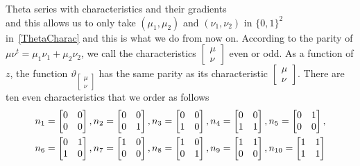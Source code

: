 \documentclass[12pt]{amsart}
\numberwithin{equation}{section}
\numberwithin{equation}{section}
\theoremstyle{definition}
\theoremstyle{remark}
\begin{document}
\begin{section}{Theta series with characteristics and their gradients}
\begin{equation}
\end{equation}
and this allows us to only take $(\mu_1,\mu_2)$ and $(\nu_1,\nu_2)$ in $\{0,1\}^2$ in~\eqref{ThetaCharac} and this is what we do from now on.
According to the parity of $\mu\nu^t=\mu_1\nu_1+\mu_2\nu_2$, we call the characteristics
$\left[\begin{smallmatrix} \mu \\ \nu \end{smallmatrix}\right]$  even or odd. As a function of $z$, the function
$\vartheta_{\left[\begin{smallmatrix}\mu \\ \nu\end{smallmatrix}\right]}$ has the same parity as its characteristic
$\left[\begin{smallmatrix}\mu \\ \nu\end{smallmatrix}\right]$.
There are ten even characteristics that we order as follows
\begin{align*}
& n_1=\left[\begin{matrix} 0 & 0 \cr 0 & 0 \cr\end{matrix}\right],
n_2=\left[\begin{matrix} 0 & 0 \cr 0 & 1 \cr\end{matrix}\right],
n_3=\left[\begin{matrix} 0 & 0 \cr 1 & 0 \cr\end{matrix}\right],
n_4=\left[\begin{matrix} 0 & 0 \cr 1 & 1 \cr\end{matrix}\right],
n_5=\left[\begin{matrix} 0 & 1 \cr 0 & 0 \cr\end{matrix}\right], \\
& n_6=\left[\begin{matrix} 0 & 1 \cr 1 & 0 \cr\end{matrix}\right],
n_7=\left[\begin{matrix} 1 & 0 \cr 0 & 0 \cr\end{matrix}\right],
n_8=\left[\begin{matrix} 1 & 0 \cr 0 & 1 \cr\end{matrix}\right],
n_9=\left[\begin{matrix} 1 & 1 \cr 0 & 0 \cr\end{matrix}\right],
n_{10}=\left[\begin{matrix} 1 & 1 \cr 1 & 1 \cr\end{matrix}\right]
\end{align*}

\end{section}
\end{document}
